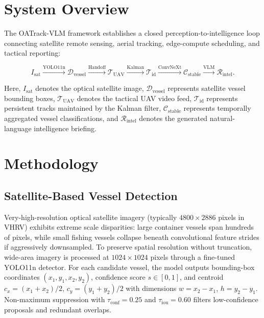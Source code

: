 \documentclass[conference]{IEEEtran}
\begin{document}
\section{System Overview}

The OATrack-VLM framework establishes a closed perception-to-intelligence loop connecting satellite remote sensing, aerial tracking, edge-compute scheduling, and tactical reporting:

\begin{equation}
I_{\text{sat}} \xrightarrow{\text{YOLO11n}} \mathcal{D}_{\text{vessel}} \xrightarrow{\text{Handoff}} \mathcal{T}_{\text{UAV}} \xrightarrow{\text{Kalman}} \mathcal{T}_{\text{id}} \xrightarrow{\text{ConvNeXt}} \mathcal{C}_{\text{stable}} \xrightarrow{\text{VLM}} \mathcal{R}_{\text{intel}}.
\end{equation}

Here, $I_{\text{sat}}$ denotes the optical satellite image, $\mathcal{D}_{\text{vessel}}$ represents satellite vessel bounding boxes, $\mathcal{T}_{\text{UAV}}$ denotes the tactical UAV video feed, $\mathcal{T}_{\text{id}}$ represents persistent tracks maintained by the Kalman filter, $\mathcal{C}_{\text{stable}}$ represents temporally aggregated vessel classifications, and $\mathcal{R}_{\text{intel}}$ denotes the generated natural-language intelligence briefing.

\section{Methodology}

\subsection{Satellite-Based Vessel Detection}
Very-high-resolution optical satellite imagery (typically $4800\times2886$ pixels in VHRV) exhibits extreme scale disparities: large container vessels span hundreds of pixels, while small fishing vessels collapse beneath convolutional feature strides if aggressively downsampled. To preserve spatial resolution without truncation, wide-area imagery is processed at $1024\times1024$ pixels through a fine-tuned YOLO11n detector. For each candidate vessel, the model outputs bounding-box coordinates $(x_1, y_1, x_2, y_2)$, confidence score $s \in [0, 1]$, and centroid $c_x = (x_1+x_2)/2$, $c_y = (y_1+y_2)/2$ with dimensions $w = x_2-x_1$, $h = y_2-y_1$. Non-maximum suppression with $\tau_{\text{conf}} = 0.25$ and $\tau_{\text{iou}} = 0.60$ filters low-confidence proposals and redundant overlaps.
\end{document}
